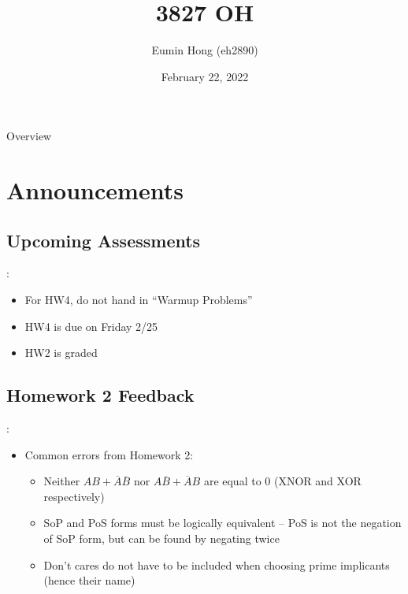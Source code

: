 \documentclass{../slides}
\title{3827 OH}
\author{Eumin Hong (eh2890)}
\institute{Columbia University}
\date{February 22, 2022}
\begin{document}
\begin{frame}
    \titlepage
\end{frame}

\begin{frame}{Overview}
\begin{multicols}{2}
\tableofcontents
\end{multicols}
\end{frame}

\section{Announcements}
\subsection{Upcoming Assessments}
\begin{frame}{\secname: \subsecname}
    \begin{itemize}
        \item For HW4, do not hand in \enquote{Warmup Problems}
        \item HW4 is due on Friday 2/25
        \item HW2 is graded
    \end{itemize}
\end{frame}

\subsection{Homework 2 Feedback}
\begin{frame}{\secname: \subsecname}
    \begin{itemize}
        \item Common errors from Homework 2:
        \begin{itemize}
            \item Neither $AB + \overbar{A}\overbar{B}$ nor $A\overbar{B} + \overbar{A}B$ are equal to $0$ (XNOR and XOR respectively)
            \item SoP and PoS forms must be logically equivalent -- PoS is not the negation of SoP form, but can be found by negating twice
            \item Don't cares do not have to be included when choosing prime implicants (hence their name)
        \end{itemize}
    \end{itemize}
\end{frame}
\end{document}
